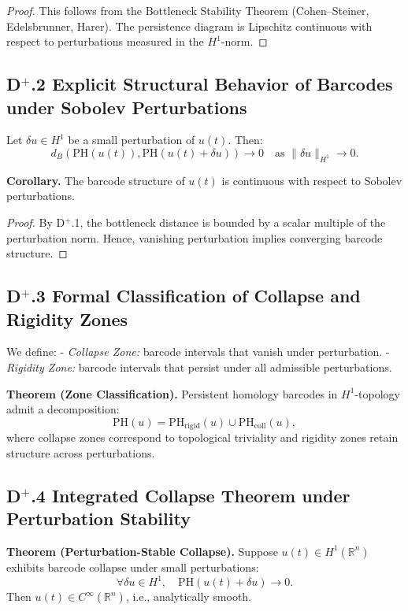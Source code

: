 \documentclass[11pt]{article}
\begin{document}
\begin{proof}
This follows from the Bottleneck Stability Theorem (Cohen–Steiner, Edelsbrunner, Harer). The persistence diagram is Lipschitz continuous with respect to perturbations measured in the \( H^1 \)-norm.
\end{proof}

\subsection*{D$^+$.2 Explicit Structural Behavior of Barcodes under Sobolev Perturbations}
Let \( \delta u \in H^1 \) be a small perturbation of \( u(t) \). Then:
\[
d_B(\mathrm{PH}(u(t)), \mathrm{PH}(u(t)+\delta u)) \to 0 \quad \text{as } \| \delta u \|_{H^1} \to 0.
\]

\textbf{Corollary.}  
The barcode structure of \( u(t) \) is continuous with respect to Sobolev perturbations.

\begin{proof}
By D$^+$.1, the bottleneck distance is bounded by a scalar multiple of the perturbation norm. Hence, vanishing perturbation implies converging barcode structure.
\end{proof}

\subsection*{D$^+$.3 Formal Classification of Collapse and Rigidity Zones}
We define:
- \textit{Collapse Zone:} barcode intervals that vanish under perturbation.
- \textit{Rigidity Zone:} barcode intervals that persist under all admissible perturbations.

\textbf{Theorem (Zone Classification).}  
Persistent homology barcodes in \( H^1 \)-topology admit a decomposition:
\[
\mathrm{PH}(u) = \mathrm{PH}_{\text{rigid}}(u) \cup \mathrm{PH}_{\text{coll}}(u),
\]
where collapse zones correspond to topological triviality and rigidity zones retain structure across perturbations.

\subsection*{D$^+$.4 Integrated Collapse Theorem under Perturbation Stability}
\textbf{Theorem (Perturbation-Stable Collapse).}  
Suppose \( u(t) \in H^1(\mathbb{R}^n) \) exhibits barcode collapse under small perturbations:
\[
\forall \delta u \in H^1, \quad \mathrm{PH}(u(t) + \delta u) \to 0.
\]
Then \( u(t) \in C^\infty(\mathbb{R}^n) \), i.e., analytically smooth.
\end{document}
